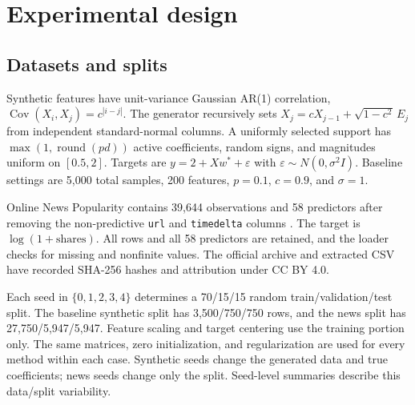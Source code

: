\documentclass{article}
\begin{document}
\section{Experimental design}
\subsection{Datasets and splits}
Synthetic features have unit-variance Gaussian AR(1) correlation, $\operatorname{Cov}(X_i,X_j)=c^{|i-j|}$. The generator recursively sets $X_j=cX_{j-1}+\sqrt{1-c^2}\,E_j$ from independent standard-normal columns. A uniformly selected support has $\max(1,\operatorname{round}(pd))$ active coefficients, random signs, and magnitudes uniform on $[0.5,2]$. Targets are $y=2+Xw^*+\varepsilon$ with $\varepsilon\sim N(0,\sigma^2I)$. Baseline settings are 5,000 total samples, 200 features, $p=0.1$, $c=0.9$, and $\sigma=1$.

Online News Popularity contains 39,644 observations and 58 predictors after removing the non-predictive \texttt{url} and \texttt{timedelta} columns \citep{uci2015}. The target is $\log(1+\mathrm{shares})$. All rows and all 58 predictors are retained, and the loader checks for missing and nonfinite values. The official archive and extracted CSV have recorded SHA-256 hashes and attribution under CC BY 4.0.

Each seed in $\{0,1,2,3,4\}$ determines a 70/15/15 random train/validation/test split. The baseline synthetic split has 3,500/750/750 rows, and the news split has 27,750/5,947/5,947. Feature scaling and target centering use the training portion only. The same matrices, zero initialization, and regularization are used for every method within each case. Synthetic seeds change the generated data and true coefficients; news seeds change only the split. Seed-level summaries describe this data/split variability.
\end{document}
